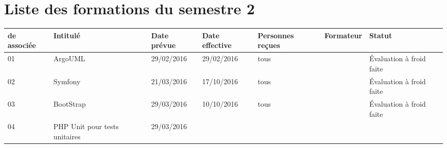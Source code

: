 \documentclass[asi,sansVersion]{picInsa}
\begin{document}
	\section*{Liste des formations du semestre 2}
		\begin{longtable}{|p{2cm}|p{3.5cm}|p{2cm}|p{2cm}|p{2cm}|c|p{2cm}|}
			\hline
			\rowcolor{gris2}
			\No{} de \FFCourt{} associée & Intitulé & Date prévue & Date effective & Personnes reçues & Formateur & Statut \\\hline
			01 & ArgoUML & 29/02/2016 & 29/02/2016 & tous & \Julie{} & Évaluation à froid faite \\\hline
			02 & Symfony & 21/03/2016 & 17/10/2016 & tous & \Florian{} & Évaluation à froid faite \\\hline
			03 & BootStrap & 29/03/2016 & 10/10/2016 & tous & \Matthieu{} & Évaluation à froid faite\\\hline
			04 & PHP Unit pour tests unitaires & 29/03/2016 &  &  &  & \\\hline
		\end{longtable}
\end{document}
